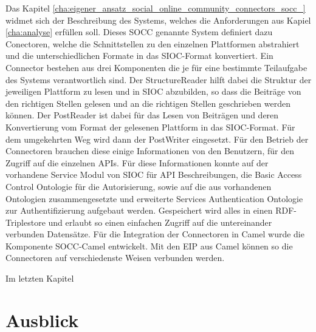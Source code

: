 Das Kapitel \ref{cha:eigener_ansatz_social_online_community_connectors_socc_} widmet sich der Beschreibung des Systems, welches die Anforderungen aus Kapiel \ref{cha:analyse} erfüllen soll. Dieses SOCC genannte System definiert dazu Conectoren, welche die Schnittstellen zu den einzelnen Plattformen abstrahiert und die unterschiedlichen Formate in das SIOC-Format konvertiert. Ein Connector bestehen aus drei Komponenten die je für eine bestimmte Teilaufgabe des Systems verantwortlich sind. Der StructureReader hilft dabei die Struktur der jeweiligen Plattform zu lesen und  in SIOC abzubilden, so dass die Beiträge von den richtigen Stellen gelesen und an die richtigen Stellen geschrieben werden können. Der PostReader ist dabei für das Lesen von Beiträgen und deren Konvertierung vom Format der gelesenen Plattform in das SIOC-Format. Für dem umgekehrten Weg wird dann der PostWriter eingesetzt. Für den Betrieb der Connectoren brauchen diese einige Informationen von den Benutzern, für den Zugriff auf die einzelnen APIs. Für diese Informationen konnte auf der vorhandene Service Modul von SIOC für API Beschreibungen, die Basic Access Control Ontologie für die Autorisierung, sowie auf die aus vorhandenen Ontologien zusammengesetzte und erweiterte Services Authentication Ontologie zur Authentifizierung aufgebaut werden. Gespeichert wird alles in einen RDF-Triplestore und erlaubt so einen einfachen Zugriff auf die untereinander verbunden Datensätze. Für die Integration der Connectoren in Camel wurde die Komponente SOCC-Camel entwickelt. Mit den EIP aus Camel können so die Connectoren auf verschiedenste Weisen verbunden werden.

Im letzten Kapitel 



\section{Ausblick} %
\label{sec:ausblick}



